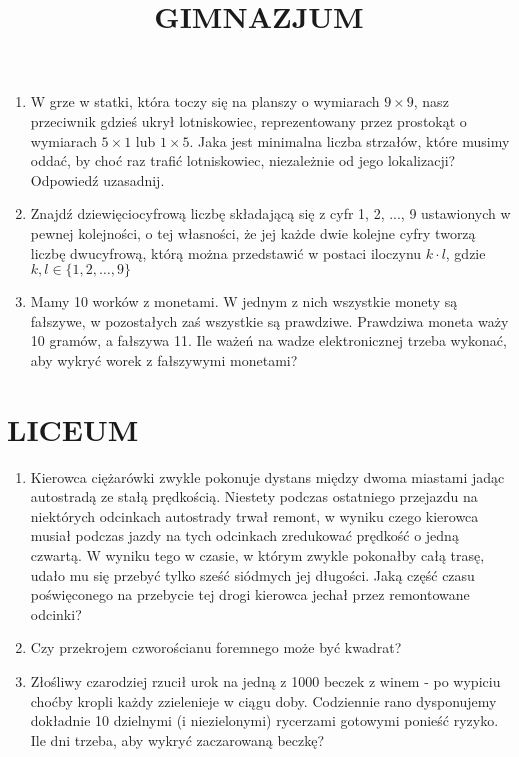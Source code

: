\documentclass[10pt]{article}
\title{GIMNAZJUM }
\author{}
\date{}
\begin{document}
\maketitle
\begin{enumerate}
  \item W grze w statki, która toczy się na planszy o wymiarach \(9 \times 9\), nasz przeciwnik gdzieś ukrył lotniskowiec, reprezentowany przez prostokąt o wymiarach \(5 \times 1\) lub \(1 \times 5\). Jaka jest minimalna liczba strzałów, które musimy oddać, by choć raz trafić lotniskowiec, niezależnie od jego lokalizacji? Odpowiedź uzasadnij.
  \item Znajdź dziewięciocyfrową liczbę składającą się z cyfr 1, 2, ..., 9 ustawionych w pewnej kolejności, o tej własności, że jej każde dwie kolejne cyfry tworzą liczbę dwucyfrową, którą można przedstawić w postaci iloczynu \(k \cdot l\), gdzie \(k, l \in\{1,2, \ldots, 9\}\)
  \item Mamy 10 worków z monetami. W jednym z nich wszystkie monety są fałszywe, w pozostałych zaś wszystkie są prawdziwe. Prawdziwa moneta waży 10 gramów, a fałszywa 11. Ile ważeń na wadze elektronicznej trzeba wykonać, aby wykryć worek z fałszywymi monetami?
\end{enumerate}

\section*{LICEUM}
\begin{enumerate}
  \item Kierowca ciężarówki zwykle pokonuje dystans między dwoma miastami jadąc autostradą ze stałą prędkością. Niestety podczas ostatniego przejazdu na niektórych odcinkach autostrady trwał remont, w wyniku czego kierowca musiał podczas jazdy na tych odcinkach zredukować prędkość o jedną czwartą. W wyniku tego w czasie, w którym zwykle pokonałby całą trasę, udało mu się przebyć tylko sześć siódmych jej długości. Jaką część czasu poświęconego na przebycie tej drogi kierowca jechał przez remontowane odcinki?
  \item Czy przekrojem czworościanu foremnego może być kwadrat?
  \item Złośliwy czarodziej rzucił urok na jedną z 1000 beczek z winem - po wypiciu choćby kropli każdy zzielenieje w ciągu doby. Codziennie rano dysponujemy dokładnie 10 dzielnymi (i niezielonymi) rycerzami gotowymi ponieść ryzyko. Ile dni trzeba, aby wykryć zaczarowaną beczkę?
\end{enumerate}
\end{document}
